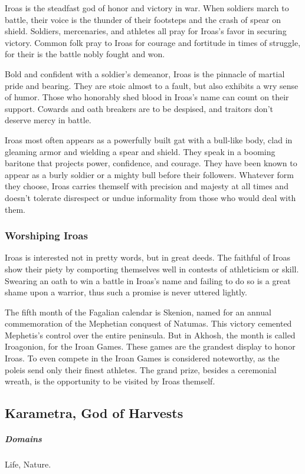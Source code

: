     Iroas is the steadfast god of honor and victory in war.
    When soldiers march to battle, their voice is the thunder of their footsteps and the crash of spear on shield.
    Soldiers, mercenaries, and athletes all pray for Iroas's favor in securing victory.
    Common folk pray to Iroas for courage and fortitude in times of struggle, for their is the battle nobly fought and won.

    Bold and confident with a soldier's demeanor, Iroas is the pinnacle of martial pride and bearing.
    They are stoic almost to a fault, but also exhibits a wry sense of humor.
    Those who honorably shed blood in Iroas's name can count on their support.
    Cowards and oath breakers are to be despised, and traitors don't deserve mercy in battle.

    Iroas most often appears as a powerfully built gat with a bull-like body, clad in gleaming armor and wielding a spear and shield.
    They speak in a booming baritone that projects power, confidence, and courage.
    They have been known to appear as a burly soldier or a mighty bull before their followers.
    Whatever form they choose, Iroas carries themself with precision and majesty at all times and doesn't tolerate disrespect or undue informality from those who would deal with them.

    \subsubsection{Worshiping Iroas}
        Iroas is interested not in pretty words, but in great deeds.
        The faithful of Iroas show their piety by comporting themselves well in contests of athleticism or skill.
        Swearing an oath to win a battle in Iroas's name and failing to do so is a great shame upon a warrior, thus such a promise is never uttered lightly.

        The fifth month of the Fagalian calendar is Skenion, named for an annual commemoration of the Mephetian conquest of Natumas.
        This victory cemented Mephetis's control over the entire peninsula.
        But in Akhosh, the month is called Iroagonion, for the Iroan Games.
        These games are the grandest display to honor Iroas.
        To even compete in the Iroan Games is considered noteworthy, as the poleis send only their finest athletes.
        The grand prize, besides a ceremonial wreath, is the opportunity to be visited by Iroas themself.

\subsection*{Karametra, God of Harvests} \label{ssec::karametra}
    \subparagraph{Domains} Life, Nature.

